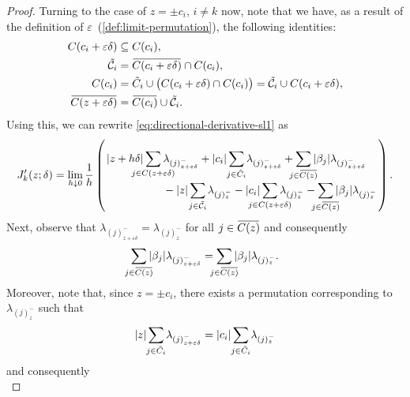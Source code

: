 \begin{proof}
  Turning to the case of \(z = \pm c_i\), \(i \neq k\) now, note that we have,
  as a result of the definition of
  \(\varepsilon\)~(\cref{def:limit-permutation}), the following identities:
  \begin{align*}
    C(c_i + \varepsilon\delta)          & \subseteq C(c_i),                                                                                                             \\
    \tilde{\mathcal{C}}_i               & = \widebar{C(c_i + \varepsilon \delta)} \cap C(c_i),                                                                          \\
    C(c_i)                              & = \tilde{C}_i \cup \big(C(c_i + \varepsilon\delta) \cap C(c_i)\big) = \tilde{\mathcal{C}}_i \cup C(c_i + \varepsilon \delta), \\
    \widebar{C(z + \varepsilon \delta)} & = \widebar{C(c_i)} \cup \tilde{\mathcal{C}}_i.
  \end{align*}
  Using this, we can rewrite \eqref{eq:directional-derivative-sl1} as
  \begin{equation*}
    \label{eq:directional-derivative-simplified}
    J'_k(z; \delta)
    = \lim_{h \downarrow 0} \frac{1}{h}
    \left(
      \splitfrac{
      |z + h\delta|\smashoperator{\sum_{j \in C(z + \varepsilon\delta)}} \lambda_{(j)^-_{z + \varepsilon\delta}}
      + |c_i|\smashoperator{\sum_{j \in \tilde{C}_i}} \lambda_{(j)^-_{z + \varepsilon\delta}}
      + \smashoperator{\sum_{j \in \widebar{C(z)}}} |\beta_j|\lambda_{(j)^-_{z + \varepsilon\delta}}
      }{%
      - |z| \smashoperator{\sum_{j \in \tilde{\mathcal{C}}_i}} \lambda_{(j)^-_{z}}
      - |c_i| \smashoperator{\sum_{j \in C(z + \varepsilon\delta)}} \lambda_{(j)^-_{z}}
      - \smashoperator{\sum_{j \in \widebar{C(z)}}} |\beta_j| \lambda_{(j)^-_{z}}
      }
    \right).
  \end{equation*}
  Next, observe that \(\lambda_{(j)^-_{z + \varepsilon\delta}} =
  \lambda_{(j)^-_{z}}\) for all \(j \in \widebar{C(z)}\) and consequently
  \[
    \smashoperator{\sum_{j \in \widebar{C(z)}}} |\beta_j|\lambda_{(j)^-_{z + \varepsilon\delta}} =
    \smashoperator{\sum_{j \in \widebar{C(z)}}} |\beta_j|\lambda_{(j)^-_{z}}.
  \]
  Moreover, note that, since \(z = \pm c_i\), there exists a permutation corresponding to
  \(\lambda_{(j)^-_{z}}\) such that
  \[
    |z|\smashoperator{\sum_{j \in \tilde{C}_i}} \lambda_{(j)^-_{z + \varepsilon\delta}}
    = |c_i| \smashoperator{\sum_{j \in \tilde{C}_i}} \lambda_{(j)^-_{z}}
  \]
  and consequently
  \begin{equation}

\end{equation}
\end{proof}
